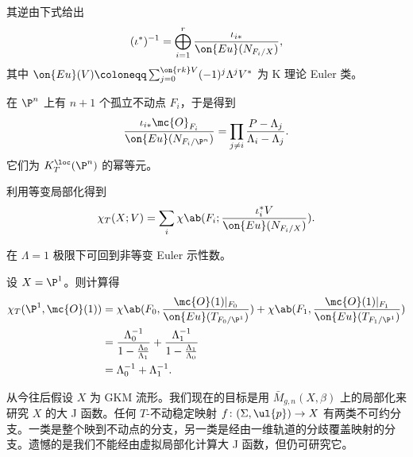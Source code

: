 \begin{rmk}
    其逆由下式给出
    \[ (\iota^*)^{-1} = \bigoplus_{i=1}^r \frac{\iota_{i*}}{\on{Eu}(N_{F_i/X})}, \]
    其中 \(\on{Eu}(V) \coloneqq \sum_{j = 0}^{\on{rk} V} (-1)^j \Lambda^j V^*\) 为 K 理论 Euler 类。
\end{rmk}

\begin{exm}
    在 \(\P^n\) 上有 \(n+1\) 个孤立不动点 \(F_i\)，于是得到
    \[ \frac{\iota_{i*} \mc{O}_{F_i}}{\on{Eu}(N_{F_i/\P^n})} = \prod_{j \neq i} \frac{P - \Lambda_j}{\Lambda_i - \Lambda_j}. \]
    它们为 \(K_T^{\loc}(\P^n)\) 的幂等元。
\end{exm}

利用等变局部化得到
\[ \chi_T(X; V) = \sum_i \chi\ab(F_i; \frac{\iota_i^* V}{\on{Eu}(N_{F_i/X})}). \]

\begin{rmk}
    在 \(\Lambda = 1\) 极限下可回到非等变 Euler 示性数。
\end{rmk}

\begin{exm}
    设 \(X = \P^1\)。则计算得
    \begin{align*}
        \chi_T(\P^1, \mc{O}(1)) &= \chi\ab(F_0, \frac{\mc{O}(1)|_{F_0}}{\on{Eu}(T_{F_0/\P^1})}) + \chi\ab(F_1, \frac{\mc{O}(1)|_{F_1}}{\on{Eu}(T_{F_1/\P^1})}) \\
        &= \frac{\Lambda_0^{-1}}{1 - \frac{\Lambda_0}{\Lambda_1}} + \frac{\Lambda_1^{-1}}{1 - \frac{\Lambda_1}{\Lambda_0}} \\
        &= \Lambda_0^{-1} + \Lambda_1^{-1}.
    \end{align*}
\end{exm}

从今往后假设 \(X\) 为 GKM 流形。我们现在的目标是用 \(\bar{M}_{g,n}(X, \beta)\) 上的局部化来研究 \(X\) 的大 J 函数。任何 \(T\)-不动稳定映射 \(f \colon (\Sigma, \ul{p}) \to X\) 有两类不可约分支。一类是整个映到不动点的分支，另一类是经由一维轨道的分歧覆盖映射的分支。遗憾的是我们不能经由虚拟局部化计算大 J 函数，但仍可研究它。

